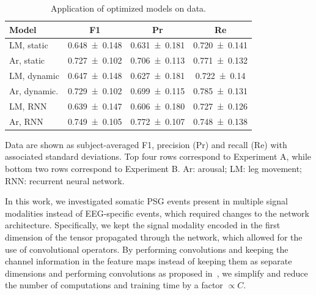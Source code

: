 \begin{table}[tb]
    \small
    \centering
    \begin{threeparttable}
    \caption[Optimized test performance]{Application of optimized models on \test data.}
    \label{tab:paperiv-test_results}
    \begin{tabular}{@{}lSSS@{}} \toprule
        \textbf{Model} & \textbf{F1} & \textbf{Pr} & \textbf{Re} \\ \midrule
        \ac{LM}, static & \num{0.648 \pm 0.148} & \num{0.631 \pm 0.181} & \num{0.720 \pm 0.141} \\
        \ac{Ar}, static & \num{0.727 \pm 0.102} & \num{0.706 \pm 0.113} & \num{0.771 \pm 0.132} \\
        \ac{LM}, dynamic & \num{0.647 \pm 0.148} & \num{0.627 \pm 0.181} & \num{0.722 \pm 0.14} \\
        \ac{Ar}, dynamic. & \num{0.729 \pm 0.102} & \num{0.699 \pm 0.115} & \num{0.785 \pm 0.131} \\ \midrule
        \ac{LM}, \ac{RNN} & \num{0.639 \pm 0.147} & \num{0.606 \pm 0.180} & \num{0.727 \pm 0.126} \\
        \ac{Ar}, \ac{RNN} & \num{0.749 \pm 0.105} & \num{0.772 \pm 0.107} & \num{0.748 \pm 0.138} \\ \bottomrule
    \end{tabular}
    \begin{tablenotes}
    \item Data are shown as subject-averaged F1, precision (Pr) and recall (Re) with associated standard deviations. Top four rows correspond to Experiment A, while bottom two rows correspond to Experiment B. \ac{Ar}: arousal; \ac{LM}: leg movement; \ac{RNN}: recurrent neural network.
    \end{tablenotes}
    \end{threeparttable}
\end{table}
In this work, we investigated somatic \ac{PSG} events present in multiple signal modalities instead of \ac{EEG}-specific events, which required changes to the network architecture. 
Specifically, we kept the signal modality encoded in the first dimension of the tensor propagated through the network, which allowed for the use of \oned convolutional operators. 
By performing \oned convolutions and keeping the channel information in the feature maps instead of keeping them as separate dimensions and performing \twod convolutions as proposed in~\cite{Chambon2018b,Chambon2019}, we simplify and reduce the number of computations and training time by a factor $\propto C$. 

